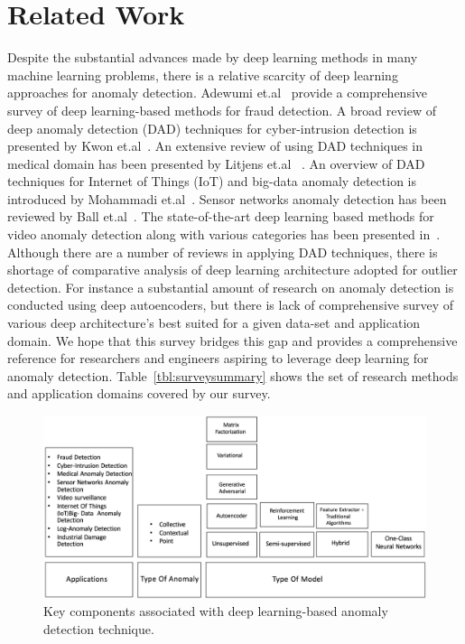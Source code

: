 \section{Related Work}
Despite the substantial advances made by deep learning methods in many machine learning problems, there
is a relative scarcity of deep learning approaches for anomaly detection. Adewumi et.al~\cite{adewumi2017survey} provide a comprehensive survey of deep learning-based methods for fraud detection. A broad review of deep anomaly detection (DAD) techniques for cyber-intrusion detection is presented by Kwon et.al~\cite{kwon2017survey}. An extensive review of using DAD techniques in medical domain has been presented by Litjens et.al ~\cite{litjens2017survey}. An  overview of DAD techniques for Internet of Things (IoT) and  big-data anomaly detection is introduced by  Mohammadi et.al~\cite{mohammadi2017deep}. Sensor networks anomaly detection has been reviewed  by  Ball et.al~\cite{ball2017comprehensive}. The state-of-the-art deep learning based methods for video anomaly detection along with various categories has been presented in~\cite{kiran2018overview}. Although there are a number of reviews in applying DAD techniques, there is shortage of comparative analysis of deep learning architecture adopted for outlier detection. For instance a substantial amount of research on anomaly detection is conducted using deep autoencoders, but there is lack of comprehensive survey of various deep architecture's best suited for a given data-set and application domain. We hope that this survey bridges this gap and provides a comprehensive reference for researchers and engineers aspiring to leverage deep learning for anomaly detection. Table~\ref{tbl:surveysummary} shows the set of research methods and application domains covered by our survey.


\begin{figure}[h]
\includegraphics[scale=0.45]{images/AnomalyDetectionTaxonomy}
\caption{Key components associated with deep learning-based anomaly detection technique.}
\label{fig:surveyTaxonomy}
\end{figure}

